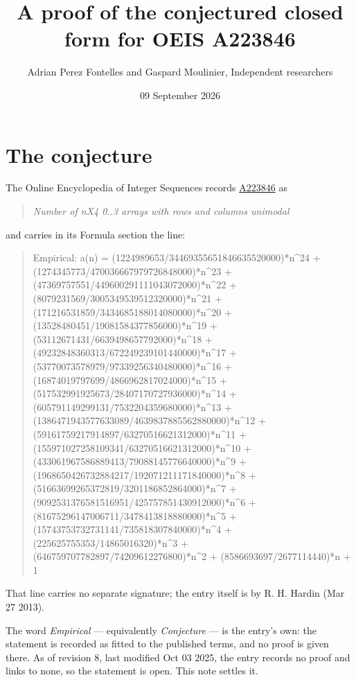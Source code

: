 \documentclass[11pt]{article}
\title{A proof of the conjectured closed form for OEIS A223846}
\author{Adrian Perez Fontelles and Gaspard Moulinier, Independent researchers}
\date{09 September 2026}
\theoremstyle{definition}
\begin{document}
\maketitle
\section{The conjecture}

The Online Encyclopedia of Integer Sequences records \href{https://oeis.org/A223846}{A223846} as

\begin{quote}\itshape Number of nX4 0..3 arrays with rows and columns unimodal\end{quote}

and carries in its Formula section the line:

\begin{quote}\ttfamily Empirical: a(n) = (1224989653/34469355651846635520000)*n\textasciicircum{}24 + (1274345773/470036667979726848000)*n\textasciicircum{}23 + (47369757551/449600291111043072000)*n\textasciicircum{}22 + (8079231569/3005349539512320000)*n\textasciicircum{}21 + (171216531859/3434685188014080000)*n\textasciicircum{}20 + (13528480451/19081584377856000)*n\textasciicircum{}19 + (53112671431/6639498657792000)*n\textasciicircum{}18 + (49232848360313/672249239101440000)*n\textasciicircum{}17 + (53770073578979/97339256340480000)*n\textasciicircum{}16 + (16874019797699/4866962817024000)*n\textasciicircum{}15 + (517532991925673/28407170727936000)*n\textasciicircum{}14 + (605791149299131/7532204359680000)*n\textasciicircum{}13 + (1386471943577633089/4639837885562880000)*n\textasciicircum{}12 + (59161759217914897/63270516621312000)*n\textasciicircum{}11 + (155971027258109341/63270516621312000)*n\textasciicircum{}10 + (433061967586889413/79088145776640000)*n\textasciicircum{}9 + (1968650426732884217/192071211171840000)*n\textasciicircum{}8 + (51663699265372819/3201186852864000)*n\textasciicircum{}7 + (9092531376581516951/425757851430912000)*n\textasciicircum{}6 + (81675296147006711/3478413818880000)*n\textasciicircum{}5 + (15743753732731141/735818307840000)*n\textasciicircum{}4 + (225625755353/14865016320)*n\textasciicircum{}3 + (646759707782897/74209612276800)*n\textasciicircum{}2 + (8586693697/2677114440)*n + 1\end{quote}

That line carries no separate signature; the entry itself is by R. H. Hardin (Mar 27 2013).

The word {\itshape Empirical} --- equivalently {\itshape Conjecture} --- is the entry's own: the statement is recorded as fitted to the published terms, and no proof is given there. As of revision 8, last modified Oct 03 2025, the entry records no proof and links to none, so the statement is open. This note settles it.
\end{document}
